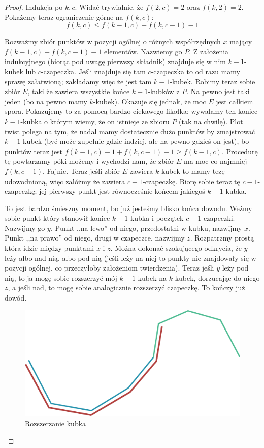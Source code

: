 \begin{proof}
	Indukcja po $k,c$. Widać trywialnie, że  $f(2,c) = 2$ oraz $f(k,2) = 2$. Pokażemy teraz ograniczenie górne na $f(k,c)$: \begin{equation*}
		f(k,c) \leq f(k-1,c) + f(k, c-1) - 1
	\end{equation*}

	Rozważmy zbiór punktów w pozycji ogólnej o różnych współrzędnych $x$ mający $ f(k-1,c) + f(k, c-1) - 1 $ elementów. Nazwiemy go $P$. Z założenia indukcyjnego (biorąc pod uwagę pierwszy składnik) znajduje się w nim $k-1$-kubek lub $c$-czapeczka. Jeśli znajduje się tam $c$-czapeczka to od razu mamy sprawę załatwioną; zakładamy więc że jest tam $k-1$-kubek. Robimy teraz sobie zbiór $E$, taki że zawiera wszystkie końce $k-1$-kubków z $P$. Na pewno jest taki jeden (bo na pewno mamy $k$-kubek). Okazuje się jednak, że moc $E$ jest całkiem spora. Pokazujemy to za pomocą bardzo ciekawego fikołka; wywalamy ten koniec $k-1$-kubka o którym wiemy, że on istnieje ze zbioru $P$ (tak na chwilę). Plot twist polega na tym, że nadal mamy dostatecznie dużo punktów by zmajstrować $k-1$ kubek (być może zupełnie gdzie indziej, ale na pewno gdzieś on jest), bo punktów teraz jest $f(k-1,c) - 1 + f(k, c-1) - 1 \geq f(k-1,c)$. Procedurę tę powtarzamy póki możemy i wychodzi nam, że zbiór $E$ ma moc co najmniej $f(k,c-1)$. Fajnie. Teraz jeśli zbiór $E$ zawiera $k$-kubek to mamy tezę udowodnioną, więc załóżmy że zawiera $c-1$-czapeczkę. Biorę sobie teraz tę $c-1$-czapeczkę; jej pierwszy punkt jest równocześnie końcem jakiegoś $k-1$-kubka.

	To jest bardzo śmieszny moment, bo już jesteśmy blisko końca dowodu. Weźmy sobie punkt który stanowił koniec $k-1$-kubka i początek $c-1$-czapeczki. Nazwijmy go $y$. Punkt ,,na lewo'' od niego, przedostatni w kubku, nazwijmy $x$. Punkt ,,na prawo'' od niego, drugi w czapeczce, nazwijmy $z$. Rozpatrzmy prostą która idzie między punktami $x$ i $z$. Można dokonać szokującego odkrycia, że $y$ leży albo nad nią, albo pod nią (jeśli leży na niej to punkty nie znajdowały się w pozycji ogólnej, co przeczyłoby założeniom twierdzenia). Teraz jeśli $y$ leży pod nią, to ja mogę sobie rozszerzyć mój $k-1$-kubek na $k$-kubek, dorzucając do niego $z$, a jeśli nad, to mogę sobie analogicznie rozszerzyć czapeczkę. To kończy już dowód.

	\begin{figure}[H]
		\centering
		\includegraphics{images/k_kubek.png}
		\caption{Rozszerzanie kubka}
	\end{figure}



\end{proof}
